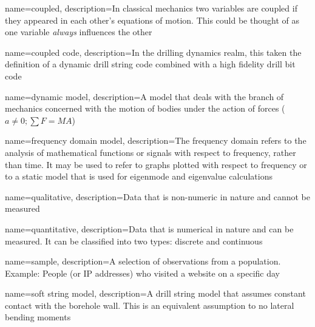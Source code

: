 

\newcommand*{\comma}{,}


{
	name=coupled,
	description=In classical mechanics two variables are coupled if they appeared in each other's equations of motion.  This could be thought of as one variable \textit{always} influences the other
}

{
	name=coupled code,
	description=In the drilling dynamics realm\comma{} this taken the definition of a dynamic drill string code combined with a high fidelity drill bit code
}

\newcommand*{\dynamicforcebalance}{$a \neq 0; \sum F = MA$}
{
	name=dynamic model,
	description=A model that deals with the branch of mechanics concerned with the motion of bodies under the action of forces (\dynamicforcebalance)
}

{
	name=frequency domain model,
	description=The frequency domain refers to the analysis of mathematical functions or signals with respect to frequency\comma{} rather than time.  It may be used to refer to graphs plotted with respect to frequency or to a static model that is used for eigenmode and eigenvalue calculations
}

{
	name=qualitative,
	description={Data that is non-numeric in nature and cannot be measured}
}

{
	name=quantitative,
	description={Data that is numerical in nature and can be measured.  It can be classified into two types: discrete and continuous}
}

{
	name=sample,
	description={A selection of observations from a population.  Example: People (or IP addresses) who visited a website on a specific day}
}

{
	name=soft string model,
	description={A drill string model that assumes constant contact with the borehole wall.  This is an equivalent assumption to no lateral bending moments}
}

